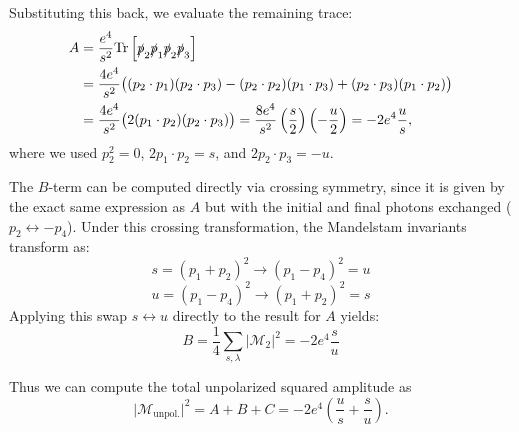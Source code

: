 Substituting this back, we evaluate the remaining trace:
\[
    \begin{aligned}
        A & = \frac{e^4}{s^2} \text{Tr}\left[ \slashed{p}_2 \slashed{p}_1 \slashed{p}_2 \slashed{p}_3 \right]                                                           \\
          & = \frac{4 e^4}{s^2} \big( (p_2 \cdot p_1)(p_2 \cdot p_3) - (p_2 \cdot p_2)(p_1 \cdot p_3) + (p_2 \cdot p_3)(p_1 \cdot p_2) \big)                            \\
          & = \frac{4 e^4}{s^2} \big( 2(p_1 \cdot p_2)(p_2 \cdot p_3) \big) = \frac{8 e^4}{s^2} \left(\frac{s}{2}\right)\left(-\frac{u}{2}\right) = -2 e^4 \frac{u}{s},
    \end{aligned}
\]
where we used $p_2^2 = 0$, $2 p_1 \cdot p_2 = s$, and $2 p_2 \cdot p_3 = -u$.

The \(B\)-term can be computed directly via crossing symmetry, since it is given by the exact same expression as \(A\) but with the initial and final photons exchanged ($p_2 \leftrightarrow -p_4$). Under this crossing transformation, the Mandelstam invariants transform as:
\[
    s = (p_1 + p_2)^2 \to (p_1 - p_4)^2 = u
\]
\[
    u = (p_1 - p_4)^2 \to (p_1 + p_2)^2 = s
\]
Applying this swap $s \leftrightarrow u$ directly to the result for $A$ yields:
\[
    B = \frac{1}{4} \sum_{s, \lambda} \vert \mathcal{M}_2 \vert^2 = -2 e^4 \frac{s}{u}
\]

Thus we can compute the total unpolarized squared amplitude as
\[
    \vert \mathcal{M}_{\text{unpol.}} \vert^2 = A + B + C = -2 e^4 \left( \frac{u}{s} + \frac{s}{u} \right).
\]

